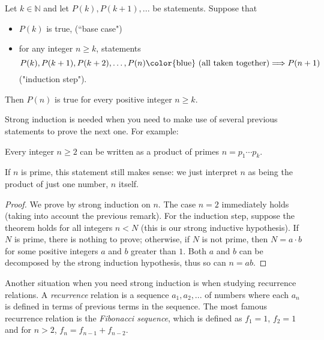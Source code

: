 \documentclass[11pt,dvipsnames]{book}
\numberwithin{figure}{section} %
\numberwithin{table}{section} %
\begin{document}
\begin{definition}
  Let $k\in \mathbb{N}$ and let $P(k),P(k+1),...$ be statements. Suppose that\
  \begin{itemize}
  \item $P(k)$ is true,  (``base case")\
  \item for any integer
$n\geqslant k$, statements
\[ P(k),P(k+1),P(k+2),\ldots,P(n)\mbox{{\color{blue} (all taken together)}}\Longrightarrow
P(n+1)\]
("induction step").
\end{itemize}
Then $P(n)$ is true for every positive integer $n\geqslant k$.
\end{definition}

\vspace{10pt}

Strong induction is needed when you need to make use of several previous statements to prove the next one. For example:

\begin{theorem}
Every integer $n\geq 2$ can be written as a product of primes $n=p_{1}\cdots p_{k}$.
\end{theorem}

If $n$ is prime, this statement still makes sense: we just interpret $n$ as being the product of just one number, $n$ itself.

\begin{proof}
We prove by strong induction on $n$. The case $n=2$ immediately holds (taking into account the previous remark). For the induction step, suppose the theorem holds for all integers $n<N$ (this is our strong inductive hypothesis).  If $N$ is prime, there is nothing to prove; otherwise, if $N$ is not prime, then $N=a\cdot b$ for some positive integers $a$ and $b$ greater than $1$. Both $a$ and $b$ can be  decomposed by the strong induction hypothesis, thus so can $n=ab$.
\end{proof}

Another situation when you need strong induction is when studying recurrence relations. A {\it recurrence} relation is a sequence $a_{1},a_{2},...$ of numbers  where each $a_{n}$ is defined in terms of previous terms in the sequence. The most famous recurrence relation is the {\it Fibonacci sequence}, which is defined  as $f_{1}=1$, $f_{2}=1$ and for $n>2$, $f_{n}=f_{n-1}+f_{n-2}$.
\end{document}
